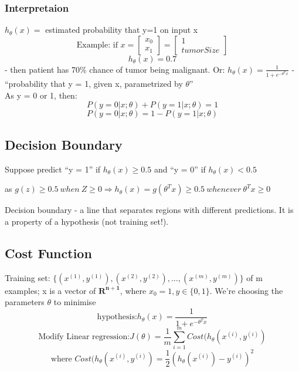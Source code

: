 \documentclass{scrartcl}
\begin{document}
\subsubsection{Interpretaion}
$h_\theta(x) = $ estimated probability that y=1 on input x
\begin{equation*}
  \textrm{Example: if }  x = \left[ \begin{array}{c} x_0 \\
      x_1  \end{array} \right] = \left[ \begin{array}{c} 1 \\
      tumorSize  \end{array} \right]
\end{equation*}
\begin{equation*} h_\theta(x) = 0.7 \end{equation*} - then patient has
70\% chance of tumor being malignant. Or: $ h_\theta(x) = \frac{1}{1 +
  e^{-\theta^Tx}}$ - ``probability that y = 1, given
x, parametrized by $\theta$'' \\
As y = 0 or 1, then:
\[P( y = 0 | x;\theta) + P(y=1|x;\theta) = 1\]
\[P( y = 0 | x;\theta) = 1 - P(y=1|x;\theta)\]

\subsection{Decision Boundary}
Suppose predict ``y = 1'' if $h_\theta(x) \geq 0.5$ and ``y = 0'' if
$h_\theta(x) < 0.5$

as $g(z) \geq 0.5 \ when \ Z \geq 0 \Rightarrow h_\theta(x) =
g(\theta^Tx) \geq 0.5 \ whenever \ \theta^Tx \geq 0$
\label {page 10 from pdf}

Decision boundary - a line that separates regions with different
predictions. It is a property of a hypothesis (not training set!).

\subsection{Cost Function}
\label{sec:6-4}
Training set: $\{(x^{(1)},y^{(1)}), (x^{(2)},y^{(2)}), \dots ,
(x^{(m)},y^{(m)})\}$ of m examples; x is a vector of
$\mathbf{R^{n+1}}$, where $x_0 = 1, y \in \{0, 1\}$. We're choosing
the parameters $\theta$ to minimise
\[ \textrm{hypothesis:} h_\theta(x) = \frac{1}{1 + e^{-\theta^T x}} \]
\[ \textrm{Modify Linear regression:} J(\theta) = \frac{1}{m}
\sum\limits_{i=1}^m Cost (h_\theta(x^{(i)}, y^{(i)}) \]
\[ \textrm{where } Cost (h_\theta(x^{(i)}, y^{(i)}) =
\frac{1}{2}(h_\theta(x^{(i)}) - y^{(i)})^2 \]
\end{document}
